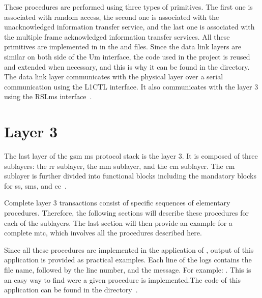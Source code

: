   These procedures are performed using three types of primitives. The
  first one is associated with random access, the second one is
  associated with the unacknowledged information transfer service, and
  the last one is associated with the multiple frame acknowledged
  information transfer services. All these primitives are implemented in
   in the  and
   files. Since the data
  link layers are similar on both side of the Um interface, the code
  used in the  project is reused and extended when
  necessary, and this is why it can be found in the
   directory. The data link layer
  communicates with the physical layer over a serial communication using
  the L1CTL interface. It also communicates with the layer 3 using the
  RSLms interface~\cite{osmocombb_ms-side_????,welte_osmocombb:_2010-1}.

  \iffalse
  interface between Layer2 and Layer3 called RSLms
  In the GSM network, Um Layer2 terminates at the BTS but
  is controlled by the BSC
  Reuse this GSM 08.58 Radio Signalling Link
  Extend it where needed for the MS case
  \fi

\section{Layer 3}

  The last layer of the \gls{gsm} \gls{ms} protocol stack is the layer
  3. It is composed of three sublayers: the \gls{rr} sublayer, the
  \gls{mm} sublayer, and the \gls{cm} sublayer. The \gls{cm} sublayer is
  further divided into functional blocks including the mandatory blocks
  for \gls{ss}, \gls{sms}, and \gls{cc}~\cite{3gpp_ts_2014-6}.

  Complete layer 3 transactions consist of specific sequences of
  elementary procedures. Therefore, the following sections will describe
  these procedures for each of the sublayers. The last section will then
  provide an example for a complete \gls{mtc}, which involves all the
  procedures described here.
  
  Since all these procedures are implemented in the 
  application of , output of this application is
  provided as practical examples. Each line of the logs contains the
  file name, followed by the line number, and the message. For example:
  . This is an easy way to
  find were a given procedure is implemented.The code of this
  application can be found in the 
  directory~\cite{3gpp_ts_2015-2,osmocombb_ms-side_????}.

